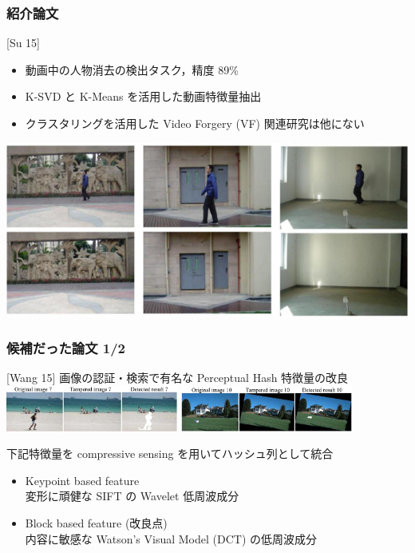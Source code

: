 \begin{frame}[plain]\frametitle{}
\titlepage %
\end{frame}


\begin{frame}\frametitle{紹介論文}
\begin{block}{[Su 15]}
\end{block}
\begin{itemize}
    \item 動画中の人物消去の検出タスク，精度 89\%
    \item K-SVD と K-Means を活用した動画特徴量抽出
    \item クラスタリングを活用した Video Forgery (VF) 関連研究は他にない
\end{itemize}
\includegraphics[scale=0.3]{figure/su.png}
\end{frame}


\begin{frame}\frametitle{候補だった論文 1/2}
\begin{block}{[Wang 15]}
画像の認証・検索で有名な Perceptual Hash 特徴量の改良
\includegraphics[height=1.5cm]{figure/wang0.png}
\includegraphics[height=1.5cm]{figure/wang1.png}
\end{block}
下記特徴量を compressive sensing を用いてハッシュ列として統合
\begin{itemize}
    \item Keypoint based feature \\
        変形に頑健な SIFT の Wavelet 低周波成分
    \item Block based feature (改良点) \\
        内容に敏感な Watson's Visual Model (DCT) の低周波成分
\end{itemize}
\end{frame}


